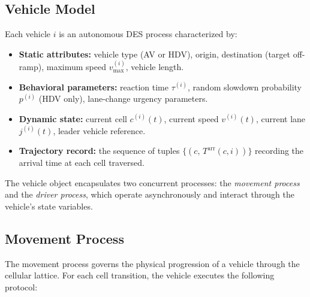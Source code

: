 \documentclass[review,number]{elsarticle}
\newcommand{\Tarr}{T^{\text{arr}}}
\begin{document}
\subsection{Vehicle Model}
\label{sec:vehicle}

Each vehicle $i$ is an autonomous DES process characterized by:

\begin{itemize}
    \item \textbf{Static attributes:} vehicle type (AV or HDV), origin, destination (target off-ramp), maximum speed $v_{\max}^{(i)}$, vehicle length.

    \item \textbf{Behavioral parameters:} reaction time $\tau^{(i)}$, random slowdown probability $p^{(i)}$ (HDV only), lane-change urgency parameters.

    \item \textbf{Dynamic state:} current cell $c^{(i)}(t)$, current speed $v^{(i)}(t)$, current lane $j^{(i)}(t)$, leader vehicle reference.

    \item \textbf{Trajectory record:} the sequence of tuples $\{(c,\, \Tarr(c, i))\}$ recording the arrival time at each cell traversed.
\end{itemize}

The vehicle object encapsulates two concurrent processes: the \emph{movement process} and the \emph{driver process}, which operate asynchronously and interact through the vehicle's state variables.

\subsection{Movement Process}
\label{sec:movement}

The movement process governs the physical progression of a vehicle through the cellular lattice. For each cell transition, the vehicle executes the following protocol:
\end{document}
